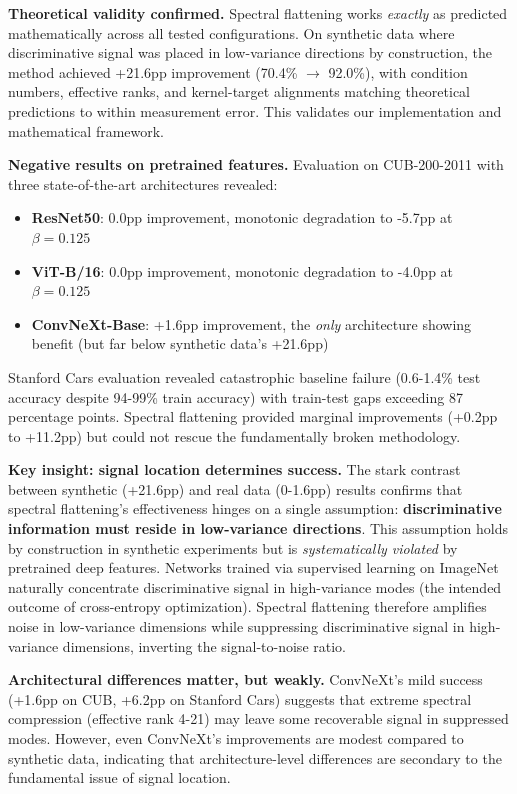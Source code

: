 \documentclass[11pt]{article}
\begin{document}
\textbf{Theoretical validity confirmed.} Spectral flattening works \emph{exactly} as predicted mathematically across all tested configurations. On synthetic data where discriminative signal was placed in low-variance directions by construction, the method achieved +21.6pp improvement (70.4\% $\to$ 92.0\%), with condition numbers, effective ranks, and kernel-target alignments matching theoretical predictions to within measurement error. This validates our implementation and mathematical framework.

\textbf{Negative results on pretrained features.} Evaluation on CUB-200-2011 with three state-of-the-art architectures revealed:
\begin{itemize}
    \item \textbf{ResNet50}: 0.0pp improvement, monotonic degradation to -5.7pp at $\beta=0.125$
    \item \textbf{ViT-B/16}: 0.0pp improvement, monotonic degradation to -4.0pp at $\beta=0.125$
    \item \textbf{ConvNeXt-Base}: +1.6pp improvement, the \emph{only} architecture showing benefit (but far below synthetic data's +21.6pp)
\end{itemize}
Stanford Cars evaluation revealed catastrophic baseline failure (0.6-1.4\% test accuracy despite 94-99\% train accuracy) with train-test gaps exceeding 87 percentage points. Spectral flattening provided marginal improvements (+0.2pp to +11.2pp) but could not rescue the fundamentally broken methodology.

\textbf{Key insight: signal location determines success.} The stark contrast between synthetic (+21.6pp) and real data (0-1.6pp) results confirms that spectral flattening's effectiveness hinges on a single assumption: \textbf{discriminative information must reside in low-variance directions}. This assumption holds by construction in synthetic experiments but is \emph{systematically violated} by pretrained deep features. Networks trained via supervised learning on ImageNet naturally concentrate discriminative signal in high-variance modes (the intended outcome of cross-entropy optimization). Spectral flattening therefore amplifies noise in low-variance dimensions while suppressing discriminative signal in high-variance dimensions, inverting the signal-to-noise ratio.

\textbf{Architectural differences matter, but weakly.} ConvNeXt's mild success (+1.6pp on CUB, +6.2pp on Stanford Cars) suggests that extreme spectral compression (effective rank 4-21) may leave some recoverable signal in suppressed modes. However, even ConvNeXt's improvements are modest compared to synthetic data, indicating that architecture-level differences are secondary to the fundamental issue of signal location.
\end{document}
